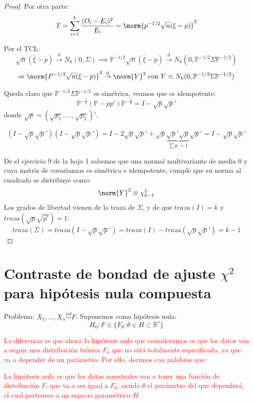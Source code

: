 \documentclass[nochap]{apuntes}
\begin{document}
\begin{proof}
Por otra parte: 
\[
T=\sum_{i=1}^k \frac{(O_i-E_i)^2}{E_i} = \norm{p^{-1/2}\sqrt{n}(\xi-p)}^2
\]

Por el TCL:
\[
\sqrt{n}(\overline{\xi}-p) \stackrel{d}{\rightarrow} N_k(0, \Sigma) \implies \mathbb{P}^{-1/2}\sqrt{n}(\overline{\xi}-p) \stackrel{d}{\rightarrow} N_k(0, \mathbb{P}^{-1/2} \Sigma  \mathbb{P}^{-1/2}) 
\]
\[
\Rightarrow \norm{P^{-1/2} \sqrt{n} (\xi-p)}^2 \stackrel{d}{\rightarrow} \norm{Y}^2 \text{ con } Y \equiv N_k(0,\mathbb{P}^{-1/2} \Sigma  \mathbb{P}^{-1/2})
\]

Queda claro que $\mathbb{P}^{-1/2} Σ  \mathbb{P}^{-1/2}$ es simétrica, veamos que es idempotente:
\[\mathbb{P}^{-\frac{1}{2}} (\mathbb{P} - pp') \mathbb{P}^{-\frac{1}{2}} = I-\sqrt{p}\sqrt{p}'\]
donde $\sqrt{p}=(\sqrt{p_1}, …, \sqrt{p_2})'$.

\[
(I-\sqrt{p}\sqrt{p}')(I-\sqrt{p}\sqrt{p}') = I-2\sqrt{p}\sqrt{p}'+\sqrt{p}\underbrace{\sqrt{p}'\sqrt{p}}_{\sum p_i=1}\sqrt{p}'=I-\sqrt{p}\sqrt{p}'
\]

De el ejercicio 9 de la hoja 1 sabemos que una normal multivariante de media 0 y cuya matriz de covarianzas es simétrica e idempotente, cumple que su norma al cuadrado se distribuye como:
\[
\norm{Y}^2 \equiv \chi^2_{k-1}
\]
Los grados de libertad vienen de la traza de $\Sigma$, y de que $traza(I)=k$ y $traza(\sqrt{p}\sqrt{p'})=1$: 
\[
traza(\Sigma)=traza(I-\sqrt{p}\sqrt{p}') = traza(I) - traza(\sqrt{p}\sqrt{p}')=k-1
\]
\end{proof}

\section{Contraste de bondad de ajuste $\chi^2$ para hipótesis nula compuesta}

Problema: $X_1,...,X_n \stackrel{iid}{\sim} F$. Suponemos como hipótesis nula:
\[
H_0 : F \in \{F_{\theta}: \theta \in H \subset \mathbb{R}^r\}
\]

\textcolor{red}{La diferencia es que ahora la hipótesis nula que consideramos es que los datos van a seguir una distribución teórica $F_0$ que no está totalmente especificada, ya que va a depender de un parámetro. Por ello, decimos con palabras que:}

\textcolor{red}{La hipótesis nula es que los datos muestrales van a tener una función de distribución $F$, que va a ser igual a $F_{\theta}$, siendo $\theta$ el parámetro del que dependerá, el cual pertenece a un espacio paramétrico $H$}
\end{document}
